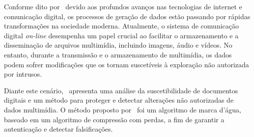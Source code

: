 Conforme dito por~\textcite{kabir2021} devido aos profundos avanços nas
tecnologias de internet e comunicação digital,
os processos de geração de dados estão passando por rápidas transformações na
sociedade moderna.
Atualmente, o sistema de comunicação digital \textit{on-line} desempenha um
papel
crucial ao facilitar o armazenamento e a disseminação de arquivos multimídia,
incluindo imagens, áudio e vídeos.
No entanto, durante a transmissão e o armazenamento de multimídia,
os dados podem sofrer modificações que os tornam suscetíveis à exploração
não autorizada por intrusos\cite{kabir2021}.

Diante este cenário,~\textcite{kabir2021} apresenta uma análise da
suscetibilidade de documentos digitais e um método para proteger e detectar
alterações não autorizadas de dados multimídia.
O método proposto por~\textcite{kabir2021} foi um algoritmo de marca d'água,
baseado em um algoritmo de compressão com perdas, a fim de garantir a
autenticação e detectar falsificações.
